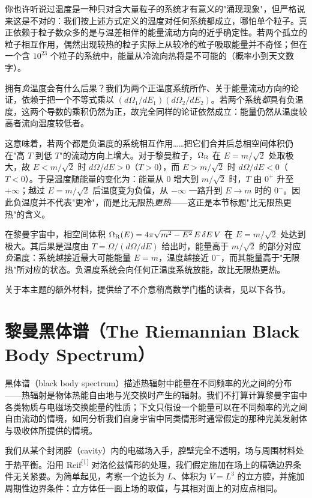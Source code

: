 你也许听说过温度是一种只对含大量粒子的系统才有意义的"涌现现象"，但严格说来这是不对的：我们按上述方式定义的温度对任何系统都成立，哪怕单个粒子。真正依赖于粒子数众多的是与温差相伴的能量流动方向的近乎确定性。若两个孤立的粒子相互作用，偶然出现较热的粒子实际上从较冷的粒子吸取能量并不奇怪；但在一个含 $10^{23}$ 个粒子的系统中，能量从冷流向热将是不可能的（概率小到天文数字）。

拥有\emph{负}温度会有什么后果？我们为两个正温度系统所作、关于能量流动方向的论证，依赖于把一个不等式乘以 $(d\Omega_{1}/dE_{1})(d\Omega_{2}/dE_{2})$。若两个系统\emph{都}具有负温度，这两个导数的乘积仍然为正，故完全同样的论证依然成立：能量仍然从温度较高者流向温度较低者。

这意味着，若两个都是负温度的系统相互作用……把它们合并后总相空间体积仍在"高 $T$ 到低 $T$"的流动方向上增大。对于黎曼粒子，$\Omega_{\mathrm{R}}$ 在 $E=m/\sqrt2$ 处取极大，故 $E<m/\sqrt2$ 时 $d\Omega/dE>0$（$T>0$），而 $E>m/\sqrt2$ 时 $d\Omega/dE<0$（$T<0$）。于是温度随能量的变化为：能量从 $0$ 增大到 $m/\sqrt2$ 时，$T$ 由 $0^{+}$ 升至 $+\infty$；越过 $E=m/\sqrt2$ 后温度变为负值，从 $-\infty$ 一路升到 $E\to m$ 时的 $0^{-}$。因此负温度并不代表"更冷"，而是比无限热\emph{更热}——这正是本节标题"比无限热更热"的含义。

\begin{notebox}[比无限热更热]
在黎曼宇宙中，相空间体积 $\Omega_{\mathrm{R}}(E)=4\pi\sqrt{m^{2}-E^{2}}\,E\,\delta E\,V$ 在 $E=m/\sqrt2$ 处达到极大。其后果是温度由 $T=\Omega/(d\Omega/dE)$ 给出时，能量高于 $m/\sqrt2$ 的部分对应\emph{负}温度：系统越接近最大可能能量 $E=m$，温度越接近 $0^{-}$，而其能量高于"无限热"所对应的状态。负温度系统会向任何正温度系统放能，故比无限热更热。
\end{notebox}

关于本主题的额外材料，提供给了不介意稍高数学门槛的读者，见以下各节。

\section{黎曼黑体谱（The Riemannian Black Body Spectrum）}

黑体谱（black body spectrum）描述热辐射中能量在不同频率的光之间的分布——热辐射是物体热能自由地与光交换时产生的辐射。我们不打算计算黎曼宇宙中各类物质与电磁场交换能量的性质；下文只假设一个能量可以在不同频率的光之间自由流动的情境，如同分析我们自身宇宙中同类情形时通常假定的那种完美发射体与吸收体所提供的情境。

我们从某个封闭腔（cavity）内的电磁场入手，腔壁完全不透明，场与周围材料处于热平衡。沿用 Reif\textsuperscript{[1]} 对洛伦兹情形的处理，我们假定施加在场上的精确边界条件无关紧要。为简单起见，考察一个边长为 $L$、体积为 $V=L^{3}$ 的立方腔，并施加周期性边界条件：立方体任一面上场的取值，与其相对面上的对应点相同。

